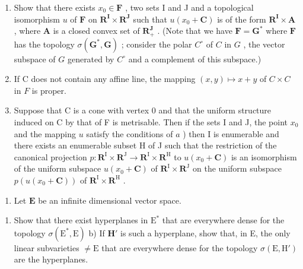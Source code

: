 \begin{enumerate}
\def\labelenumi{\alph{enumi})}
\item
  Show that there exists \(x_0 \in \mathbf{F}\) , two sets I and J and a topological isomorphism \(u\) of \(\mathbf{F}\) on \(\mathbf{R}^{\mathbf{I}} \times \mathbf{R}^{\mathbf{J}}\) such that \(u(x_0 + \mathbf{C})\) is of the form \(\mathbf{R}^{\mathbf{I}} \times \mathbf{A}\) , where \(\mathbf{A}\) is a closed convex set of \(\mathbf{R}_+^{\mathbf{J}}\) . (Note that we have \(\mathbf{F} = \mathbf{G}^*\) where \(\mathbf{F}\) has the topology \(\sigma(\mathbf{G}^*, \mathbf{G})\) ; consider the polar \(C^\circ\) of \(C\) in \(G\) , the vector subspace of \(G\) generated by \(C^\circ\) and a complement of this subspace.)
\item
  If C does not contain any affine line, the mapping \((x, y) \mapsto x + y\) of \(C \times C\) in \(F\) is proper.
\item
  Suppose that C is a cone with vertex 0 and that the uniform structure induced on C by that of F is metrisable. Then if the sets I and J, the point \(x_0\) and the mapping \(u\) satisfy the conditions of \(a\) ) then I is enumerable and there exists an enumerable subset H of J such that the restriction of the canonical projection \(p: \mathbf{R}^{\mathrm{I}} \times \mathbf{R}^{\mathrm{J}} \to \mathbf{R}^{\mathrm{I}} \times \mathbf{R}^{\mathrm{H}}\) to \(u(x_0 + \mathbf{C})\) is an isomorphism of the uniform subspace \(u(x_0 + \mathbf{C})\) of \(\mathbf{R}^{\mathrm{I}} \times \mathbf{R}^{\mathrm{J}}\) on the uniform subspace \(p(u(x_0 + \mathbf{C}))\) of \(\mathbf{R}^{\mathrm{I}} \times \mathbf{R}^{\mathrm{H}}\) .
\end{enumerate}

\begin{enumerate}
\def\labelenumi{\arabic{enumi})}
\setcounter{enumi}{16}
\tightlist
\item
  Let \(\mathbf{E}\) be an infinite dimensional vector space.
\end{enumerate}

\begin{enumerate}
\def\labelenumi{\alph{enumi})}
\tightlist
\item
  Show that there exist hyperplanes in \(\mathrm{E}^*\) that are everywhere dense for the topology \(\sigma (\mathrm{E}^{*},\mathrm{E})\) b) If \(\mathbf{H}'\) is such a hyperplane, show that, in E, the only linear subvarieties \(\neq \mathrm{E}\) that are everywhere dense for the topology \(\sigma (\mathrm{E},\mathrm{H}')\) are the hyperplanes.
\end{enumerate}

